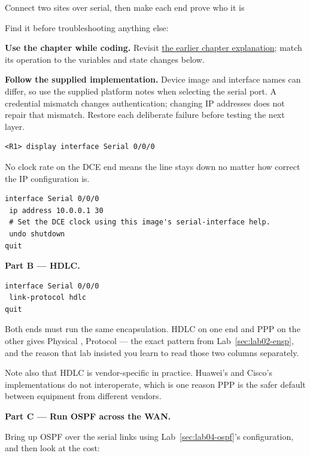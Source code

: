 \begin{labproject}{Connect two sites over serial, then make each end prove who it is}
\begin{keyidea}
Find it before troubleshooting anything else:




\textbf{Use the chapter while coding.} Revisit \hyperref[ch:wan]{the earlier chapter explanation}; match its operation to the variables and state changes below.

\textbf{Follow the supplied implementation.} Device image and interface names can differ, so use the supplied platform notes when selecting the serial port. A credential mismatch changes authentication; changing IP addresses does not repair that mismatch. Restore each deliberate failure before testing the next layer.


\begin{lstlisting}[style=utpterminal]
<R1> display interface Serial 0/0/0
\end{lstlisting}

No clock rate on the DCE end means the line stays down no matter how correct the IP configuration is.
\end{keyidea}

\begin{lstlisting}[style=utpterminal]
interface Serial 0/0/0
 ip address 10.0.0.1 30
 # Set the DCE clock using this image's serial-interface help.
 undo shutdown
quit
\end{lstlisting}

\medskip\noindent\textbf{Part B --- HDLC.}\par

\begin{lstlisting}[style=utpterminal]
interface Serial 0/0/0
 link-protocol hdlc
quit
\end{lstlisting}

\begin{pitfall}
Both ends must run the same encapsulation. HDLC on one end and PPP on the other gives Physical , Protocol  --- the exact pattern from Lab~\ref{sec:lab02-ensp}, and the reason that lab insisted you learn to read those two columns separately.

Note also that HDLC is vendor-specific in practice. Huawei's and Cisco's implementations do not interoperate, which is one reason PPP is the safer default between equipment from different vendors.
\end{pitfall}

\medskip\noindent\textbf{Part C --- Run OSPF across the WAN.}\par
Bring up OSPF over the serial links using Lab~\ref{sec:lab04-ospf}'s configuration, and then look at the cost:


\end{labproject}
